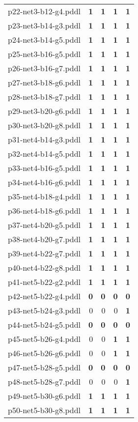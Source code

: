 \documentclass{article}
\begin{document}
\begin{tabular}{@{}lrrrr@{}}
p22-net3-b12-g4.pddl & \textbf{1} & \textbf{1} & \textbf{1} & \textbf{1} \\
p23-net3-b14-g3.pddl & \textbf{1} & \textbf{1} & \textbf{1} & \textbf{1} \\
p24-net3-b14-g5.pddl & \textbf{1} & \textbf{1} & \textbf{1} & \textbf{1} \\
p25-net3-b16-g5.pddl & \textbf{1} & \textbf{1} & \textbf{1} & \textbf{1} \\
p26-net3-b16-g7.pddl & \textbf{1} & \textbf{1} & \textbf{1} & \textbf{1} \\
p27-net3-b18-g6.pddl & \textbf{1} & \textbf{1} & \textbf{1} & \textbf{1} \\
p28-net3-b18-g7.pddl & \textbf{1} & \textbf{1} & \textbf{1} & \textbf{1} \\
p29-net3-b20-g6.pddl & \textbf{1} & \textbf{1} & \textbf{1} & \textbf{1} \\
p30-net3-b20-g8.pddl & \textbf{1} & \textbf{1} & \textbf{1} & \textbf{1} \\
p31-net4-b14-g3.pddl & \textbf{1} & \textbf{1} & \textbf{1} & \textbf{1} \\
p32-net4-b14-g5.pddl & \textbf{1} & \textbf{1} & \textbf{1} & \textbf{1} \\
p33-net4-b16-g5.pddl & \textbf{1} & \textbf{1} & \textbf{1} & \textbf{1} \\
p34-net4-b16-g6.pddl & \textbf{1} & \textbf{1} & \textbf{1} & \textbf{1} \\
p35-net4-b18-g4.pddl & \textbf{1} & \textbf{1} & \textbf{1} & \textbf{1} \\
p36-net4-b18-g6.pddl & \textbf{1} & \textbf{1} & \textbf{1} & \textbf{1} \\
p37-net4-b20-g5.pddl & \textbf{1} & \textbf{1} & \textbf{1} & \textbf{1} \\
p38-net4-b20-g7.pddl & \textbf{1} & \textbf{1} & \textbf{1} & \textbf{1} \\
p39-net4-b22-g7.pddl & \textbf{1} & \textbf{1} & \textbf{1} & \textbf{1} \\
p40-net4-b22-g8.pddl & \textbf{1} & \textbf{1} & \textbf{1} & \textbf{1} \\
p41-net5-b22-g2.pddl & \textbf{1} & \textbf{1} & \textbf{1} & \textbf{1} \\
p42-net5-b22-g4.pddl & \textbf{0} & \textbf{0} & \textbf{0} & \textbf{0} \\
p43-net5-b24-g3.pddl & 0 & 0 & 0 & \textbf{1} \\
p44-net5-b24-g5.pddl & \textbf{0} & \textbf{0} & \textbf{0} & \textbf{0} \\
p45-net5-b26-g4.pddl & 0 & 0 & \textbf{1} & \textbf{1} \\
p46-net5-b26-g6.pddl & 0 & 0 & \textbf{1} & \textbf{1} \\
p47-net5-b28-g5.pddl & \textbf{0} & \textbf{0} & \textbf{0} & \textbf{0} \\
p48-net5-b28-g7.pddl & 0 & 0 & 0 & \textbf{1} \\
p49-net5-b30-g6.pddl & \textbf{1} & \textbf{1} & \textbf{1} & \textbf{1} \\
p50-net5-b30-g8.pddl & \textbf{1} & \textbf{1} & \textbf{1} & \textbf{1} \\
\end{tabular}
\end{document}

